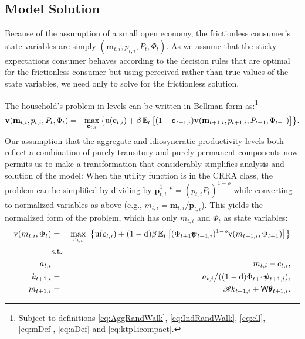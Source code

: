 \documentclass[titlepage]{./econtex}
\begin{document}
\subsection{Model Solution}

Because of the assumption of a small open economy, the frictionless consumer's state variables are simply $(\mathbf{m}_{t,i},p_{t,i},P_t,\Phi_t)$.  As we assume that the sticky expectations consumer behaves according to the decision rules that are optimal for the frictionless consumer but using perceived rather than true values of the state variables, we need only to solve for the frictionless solution.

The household's problem in levels can be written in Bellman form as:\footnote{Subject to definitions \eqref{eq:AggRandWalk}, \eqref{eq:IndRandWalk}, \eqref{eq:ell}, \eqref{eq:mDef}, \eqref{eq:aDef} and \eqref{eq:ktp1icompact}.}
\begin{eqnarray*}
\textbf{v}(\mathbf{m}_{t,i},p_{t,i},P_t,\Phi_t)  & = &  \max_{\mathbf{c}_{t,i}}  \big\{ {\mathrm{u}}(\mathbf{c}_{t,i}) + \beta \operatorname{\mathbb{E}}_t \big[(1-\mathsf{d}_{t+1,i})\textbf{v}(\mathbf{m}_{t+1,i},p_{t+1,i},P_{t+1},\Phi_{t+1})\big] \big\}. \nonumber
\end{eqnarray*}
Our assumption that the aggregate and idiosyncratic productivity levels both reflect a combination of purely transitory and purely permanent components now permits us to make a transformation that considerably simplifies analysis and solution of the model: When the utility function is in the CRRA class, the problem can be simplified by dividing by $\pmb{p}_{t,i}^{1-\rho} = (p_{t,i}P_t)^{1-\rho}$ while converting to normalized variables as above (e.g., $m_{t,i}=\mathbf{m}_{t,i}/\pmb{p}_{t,i}$). This yields the normalized form of the problem, which has only $m_{t,i}$ and $\Phi_t$ as state variables:
\begin{eqnarray}
    \mathrm{v}({m}_{t,i},\Phi_t) & = & \max_{c_{t,i}} ~ \big\{ {\mathrm{u}}(c_{t,i}) + (1-\mathrm{d}) \beta
    \operatorname{\mathbb{E}}_{t}\big[ (\Phi_{t+1} \pmb{\psi}_{t+1,i})^{1-\rho}\mathrm{v}(m_{t+1,i},\Phi_{t+1})\big] \big\}
    \label{eq:scaledv}
\\  & \mbox{s.t.} & \nonumber
\\    a_{t,i}   & = & m_{t,i} - c_{t,i}, \nonumber
\\    k_{t+1,i} & = & a_{t,i} \big/( (1-\mathrm{d}) \Phi_{t+1} \pmb{\psi}_{t+1,i} ),  \nonumber
\\    m_{t+1,i} & = & \mathscr{R} k_{t+1,i} + \mathsf{W} \pmb{\theta}_{t+1,i}.  \nonumber
\end{eqnarray}
 
\end{document}
